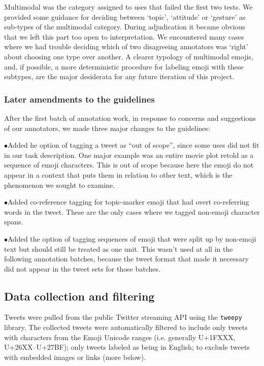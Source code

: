 \documentclass[11pt]{article}
\def\st{$\bullet$}
\begin{document}
Multimodal was the category assigned to uses that failed the first two tests. We provided
some guidance for deciding between `topic', `attitude' or `gesture' as sub-types of the multimodal category.
During adjudication it became obvious that we left this part too open to interpretation. We encountered many
cases where we had trouble deciding which of two disagreeing annotators was `right' about choosing one type
over another. A clearer typology of multimodal emojis, and, if possible, a more deterministic procedure for
labeling emoji with these subtypes, are the major desiderata for any future iteration of this project.

\subsubsection{Later amendments to the guidelines}

After the first batch of annotation work, in response to concerns and suggestions of our annotators, we made
three major changes to the guidelines:

\st Added he option of tagging a tweet as ``out of scope'', since some uses did not fit in our task description. One
major example was an entire movie plot retold as a sequence of emoji characters. This is out of scope because
here the emoji do not appear in a context that puts them in relation to other text, which is the phenomenon
we sought to examine.

\st Added co-reference tagging for topic-marker emoji that had overt co-referring words in the tweet. These are
the only cases where we tagged non-emoji character spans.

\st Added the option of tagging sequences of emoji that were split up by non-emoji text but should still be
treated as one unit. This wasn't used at all in the following annotation batches, because the tweet format that
made it necessary did not appear in the tweet sets for those batches.


\subsection{Data collection and filtering}
Tweets were pulled from the public Twitter streaming API using the \texttt{tweepy} library. The collected tweets were automatically filtered to include only tweets with characters from the Emoji Unicode ranges (i.e. generally U+1FXXX, U+26XX--U+27BF); only tweets labeled as being in English; to exclude tweets with embedded images or links (more below).
\end{document}
